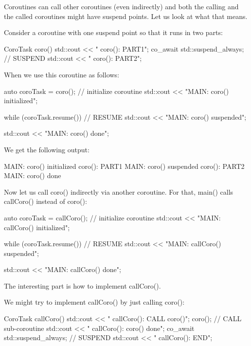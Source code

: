 Coroutines can call other coroutines (even indirectly) and both the calling and the called coroutines might have suspend points. Let us look at what that means.

Consider a coroutine with one suspend point so that it runs in two parts:

\begin{cpp}
CoroTask coro()
{
	std::cout << " coro(): PART1\n";
	co_await std::suspend_always{}; // SUSPEND
	std::cout << " coro(): PART2\n";
}
\end{cpp}

When we use this coroutine as follows:

\begin{cpp}
auto coroTask = coro(); // initialize coroutine
std::cout << "MAIN: coro() initialized\n";

while (coroTask.resume()) { // RESUME
	std::cout << "MAIN: coro() suspended\n";
}

std::cout << "MAIN: coro() done\n";
\end{cpp}

We get the following output:

\begin{shell}
MAIN: coro() initialized
    coro(): PART1
MAIN: coro() suspended
    coro(): PART2
MAIN: coro() done
\end{shell}

Now let us call coro() indirectly via another coroutine. For that, main() calls callCoro() instead of coro():

\begin{cpp}
auto coroTask = callCoro(); // initialize coroutine
std::cout << "MAIN: callCoro() initialized\n";

while (coroTask.resume()) { // RESUME
	std::cout << "MAIN: callCoro() suspended\n";
}

std::cout << "MAIN: callCoro() done\n";
\end{cpp}

The interesting part is how to implement callCoro().


We might try to implement callCoro() by just calling coro():

\begin{cpp}
CoroTask callCoro()
{
	std::cout << " callCoro(): CALL coro()\n";
	coro(); // CALL sub-coroutine
	std::cout << " callCoro(): coro() done\n";
	co_await std::suspend_always{}; // SUSPEND
	std::cout << " callCoro(): END\n";
}
\end{cpp}

